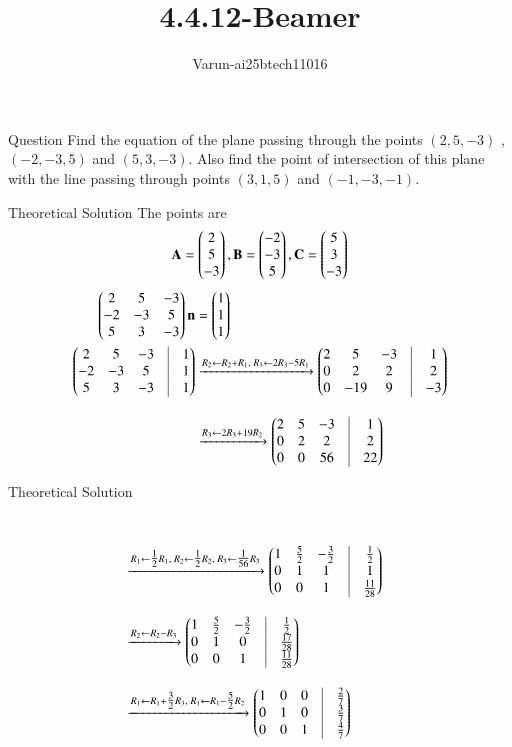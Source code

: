 \documentclass{beamer}
\title %
{4.4.12-Beamer}
\author %
{Varun-ai25btech11016}
\begin{document}
\frame{\titlepage}
\begin{frame}{Question}
Find the equation of the plane passing through the points $(2, 5, -3)$ , $(-2, -3, 5)$ and
$(5, 3, -3)$. Also find the point of intersection of this plane with the line passing
through points $(3, 1, 5)$ and $(-1, -3, -1)$.
\end{frame}
\begin{frame}{Theoretical Solution }
The points are 
\begin{align}
\mathbf{A}=\begin{pmatrix}2\\5\\-3\end{pmatrix}  ,\mathbf{B}=\begin{pmatrix}-2\\-3\\5\end{pmatrix} , \mathbf{C}=\begin{pmatrix}5\\3\\-3\end{pmatrix}
\end{align}
\begin{align} 
\myvec{2 & 5 & -3 \\
-2 & -3 & 5  \\
5 & 3 & -3 }\vec{n}&=\myvec{1\\1\\1}\\
\myvec{2 & 5 & -3 & \vline & 1 \\
-2 & -3 & 5 & \vline & 1 \\
5 & 3 & -3 & \vline & 1}\nonumber
&\xrightarrow{R_2 \leftarrow R_2 + R_1,\; R_3 \leftarrow 2R_3 - 5R_1}
\myvec{2 & 5 & -3 & \vline & 1 \\
0 & 2 & 2 & \vline & 2 \\
0 & -19 & 9 & \vline & -3}\nonumber
\\[1em]
&\xrightarrow{R_3 \leftarrow 2R_3 + 19R_2}
\myvec{2 & 5 & -3 & \vline & 1 \\
0 & 2 & 2 & \vline & 2 \\
0 & 0 & 56 & \vline & 22}\nonumber\end{align}
\end{frame}
\begin{frame}{Theoretical Solution }
\begin{align}
\\[1em]
&\xrightarrow{R_1 \leftarrow \tfrac{1}{2}R_1,\; R_2 \leftarrow \tfrac{1}{2}R_2,\; R_3 \leftarrow \tfrac{1}{56}R_3}
\myvec{1 & \tfrac{5}{2} & -\tfrac{3}{2} & \vline & \tfrac{1}{2} \\
0 & 1 & 1 & \vline & 1 \\
0 & 0 & 1 & \vline & \tfrac{11}{28}
}\nonumber
\\[1em]
&\xrightarrow{R_2 \leftarrow R_2 - R_3}
\myvec{1 & \tfrac{5}{2} & -\tfrac{3}{2} & \vline & \tfrac{1}{2} \\
0 & 1 & 0 & \vline & \tfrac{17}{28} \\
0 & 0 & 1 & \vline & \tfrac{11}{28}}\nonumber
\\[1em]
&\xrightarrow{R_1 \leftarrow R_1 + \tfrac{3}{2}R_3,\; R_1 \leftarrow R_1 - \tfrac{5}{2}R_2}
\myvec{1 & 0 & 0 & \vline & \tfrac{2}{7} \\
0 & 1 & 0 & \vline & \tfrac{3}{7} \\
0 & 0 & 1 & \vline & \tfrac{4}{7}}\nonumber
\end{align}
\end{frame}
\end{document}

